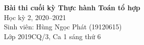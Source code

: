 \documentclass[12pt]{article}
\begin{document}
\begin{center}
    \LARGE{\bfseries Bài thi cuối kỳ Thực hành Toán tổ hợp} \\
    \Large{Học kỳ 2, 2020--2021}\\
    \large{Sinh viên: Hùng Ngọc Phát (19120615)}\\
    \large{Lớp 2019CQ/3, Ca 1 sáng thứ 6}\\[1.5cm]
\end{center}

\newpage
\newpage
\newpage
\newpage
\newpage




\renewcommand{\bibname}{Tài liệu tham khảo}


\end{document}
